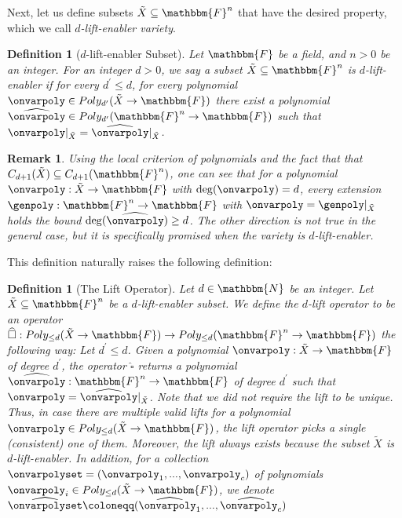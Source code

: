 \documentclass[10pt,a4paper]{article}
\newtheorem{definition}[theorem]{Definition}
\newtheorem{remark}[theorem]{Remark}
\newcommand{\definedas}[0]{\coloneqq}
\newcommand{\basefield}[0]{\mathbbm{F}}
\newcommand{\blocklength}[0]{n}
\newcommand{\field}[0]{\basefield^{\blocklength}}
\newcommand{\degree}[0]{d}
\newcommand{\funcdef}[3]{#1:#2\rightarrow#3}
\newcommand{\restrictfunc}[2]{#1|_{#2}}
\newcommand{\allpolyset}[3]{Poly_{#1}(#2\rightarrow#3)}
\newcommand{\cubes}[2]{C_{#1}(#2)}
\newcommand{\naturalnumbersset}[0]{\mathbbm{N}}
\newcommand{\variety}{{\tilde{X}}}
\newcommand{\lift}[1]{\widehat{#1}}
\begin{document}
Next, let us define subsets $\variety \subseteq \field$ that have the desired property, which we call \emph{$\degree$-lift-enabler variety}.
\begin{definition}[$\degree$-lift-enabler Subset]
    Let $\basefield$ be a field, and $\blocklength>0$ be an integer.
    For an integer $\degree > 0$, we say a subset $\variety\subseteq\field$ is \emph{$\degree$-lift-enabler} if for every $\degree^{\prime} \leq \degree$,
    for every polynomial $\onvarpoly \in \allpolyset{\degree^{\prime}}{\variety}{\basefield}$
    there exist a polynomial $\lift{\onvarpoly} \in \allpolyset{\degree^{\prime}}{\field}{\basefield}$ such that $\restrictfunc{\onvarpoly}{\variety}=\restrictfunc{\lift{\onvarpoly}}{\variety}$.
\end{definition}
\begin{remark}
    Using the local criterion of polynomials and the fact that that $\cubes{\degree+1}{\variety} \subseteq \cubes{\degree+1}{\field}$,
    one can see that for a polynomial $\funcdef{\onvarpoly}{\variety}{\basefield}$ with $\deg(\onvarpoly) = \degree$,
    every extension $\funcdef{\genpoly}{\field}{\basefield}$ with $\onvarpoly = \restrictfunc{\genpoly}{\variety}$
    holds the bound $\deg(\lift{\onvarpoly}) \geq \degree$.
    The other direction is not true in the general case, but it is specifically promised when the variety is $\degree$-lift-enabler.
\end{remark}

This definition naturally raises the following definition:
\begin{definition}[The Lift Operator]
    Let $\degree \in \naturalnumbersset$ be an integer.
    Let $\variety \subseteq \field$ be a $\degree$-lift-enabler subset.
    We define \emph{the $\degree$-lift operator} to be an operator $\funcdef{\lift{\square}}{\allpolyset{\leq \degree}{\variety}{\basefield}}{\allpolyset{\leq \degree}{\field}{\basefield}}$ the following way:
    \newline
    Let $\degree^\prime \leq \degree$.
    Given a polynomial $\funcdef{\onvarpoly}{\variety}{\basefield}$ of degree $\degree^\prime$, the operator $\lift{\square}$ returns a polynomial $\funcdef{\lift{\onvarpoly}}{\field}{\basefield}$ of degree $\degree^\prime$
    such that $\onvarpoly = \restrictfunc{\lift{\onvarpoly}}{\variety}$.
    Note that we did not require the lift to be unique.
    Thus, in case there are multiple valid lifts for a polynomial $\onvarpoly \in \allpolyset{\leq \degree}{\variety}{\basefield}$, the lift operator picks a single (consistent) one of them.
    Moreover, the lift always exists because the subset $\variety$ is $\degree$-lift-enabler.
    \newline
    In addition, for a collection $\onvarpolyset = (\onvarpoly_1,...,\onvarpoly_c)$ of polynomials $\onvarpoly_i \in \allpolyset{\leq \degree}{\variety}{\basefield}$,
    we denote $\lift{\onvarpolyset} \definedas (\lift{\onvarpoly_1},...,\lift{\onvarpoly_c})$
\end{definition}
\end{document}
